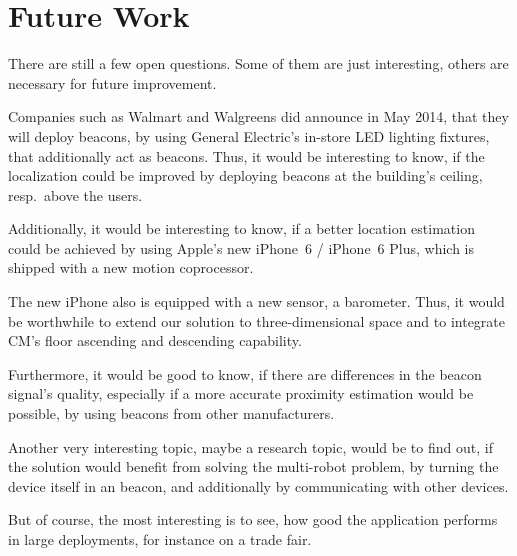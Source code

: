 
\section{Future Work} \label{sec:future}
There are still a few open questions. Some of them are just interesting, others are necessary for future improvement.

Companies such as Walmart and Walgreens did announce in May 2014, that they will deploy beacons, by using General Electric's in-store LED lighting fixtures, that additionally act as beacons. Thus, it would be interesting to know, if the localization could be improved by deploying beacons at the building's ceiling, resp.\ above the users.

Additionally, it would be interesting to know, if a better location estimation could be achieved by using Apple's new iPhone~6 / iPhone~6 Plus, which is shipped with a new motion coprocessor.

The new iPhone also is equipped with a new sensor, a barometer. Thus, it would be worthwhile to extend our solution to three-dimensional space and to integrate \acl{CM}'s floor ascending and descending capability.

Furthermore, it would be good to know, if there are differences in the beacon signal's quality, especially if a more accurate proximity estimation would be possible, by using beacons from other manufacturers.

Another very interesting topic, maybe a research topic, would be to find out, if the solution would benefit from solving the multi-robot problem, by turning the device itself in an beacon, and additionally by communicating with other devices.

But of course, the most interesting is to see, how good the application performs in large deployments, for instance on a trade fair.


